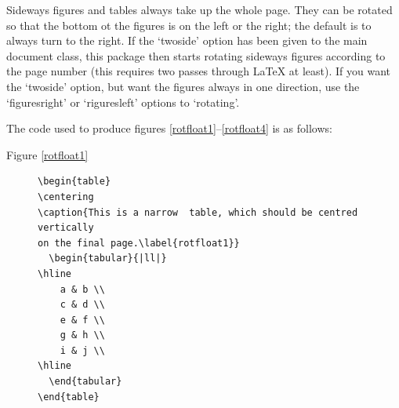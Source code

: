 \documentclass[twoside]{report}
\begin{document}
Sideways figures and tables always take up the whole page. They can be
rotated so that the bottom ot the figures is on the left or the right;
the default is to always turn to the right. If the `twoside' option
has been given to the main document class, this package then starts
rotating sideways figures according to the page number (this requires
two passes through \LaTeX{} at least). If you want the `twoside'
option, but want the figures always in one direction, use the
`figuresright' or `riguresleft' options to `rotating'.

The code used to produce figures
\ref{rotfloat1}--\ref{rotfloat4} is as follows:
\begin{description}

\item[Figure \ref{rotfloat1}]
{\small\begin{verbatim}
\begin{table}
\centering
\caption{This is a narrow  table, which should be centred vertically
on the final page.\label{rotfloat1}}
  \begin{tabular}{|ll|}
\hline
    a & b \\
    c & d \\
    e & f \\
    g & h \\
    i & j \\
\hline
  \end{tabular}
\end{table}
\end{verbatim}
}


\end{description}
\end{document}
